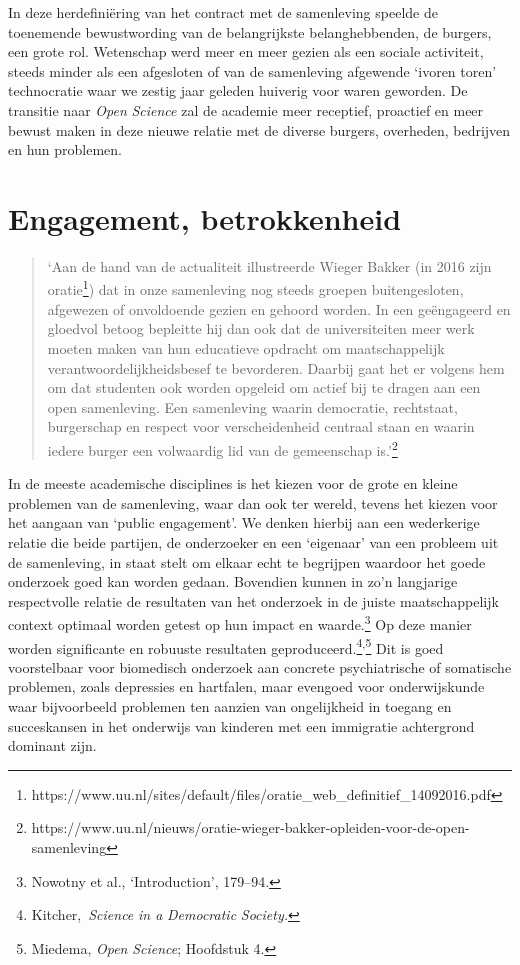 \documentclass[smallauthor, chapterhaspagenum, nochapterinheader, pagenuminheader,  bigchapnum,medium2, tocpages, garamond, titleinheader]{jote-book}
\begin{document}
	In deze herdefiniëring van het contract met de samenleving speelde de toenemende bewustwording van de belangrijkste belanghebbenden, de burgers, een grote rol. Wetenschap werd meer en meer gezien als een sociale activiteit, steeds minder als een afgesloten of van de samenleving afgewende ‘ivoren toren' technocratie waar we zestig jaar geleden huiverig voor waren geworden. De transitie naar \emph{Open }\emph{Science} zal de academie meer receptief, proactief en meer bewust maken in deze nieuwe relatie met de diverse burgers, overheden, bedrijven en hun problemen.



	\section{Engagement, betrokkenheid}

	\begin{quote}
		\itshape

		‘Aan de hand van de actualiteit illustreerde Wieger Bakker (in 2016 zijn oratie\footnote{https://www.uu.nl/sites/default/files/oratie\_web\_definitief\_14092016.pdf}) dat in onze samenleving nog steeds groepen buitengesloten, afgewezen of onvoldoende gezien en gehoord worden. In een geëngageerd en gloedvol betoog bepleitte hij dan ook dat de universiteiten meer werk moeten maken van hun educatieve opdracht om maatschappelijk verantwoordelijkheidsbesef te bevorderen. Daarbij gaat het er volgens hem om dat studenten ook worden opgeleid om actief bij te dragen aan een open samenleving. Een samenleving waarin democratie, rechtstaat, burgerschap en respect voor verscheidenheid centraal staan en waarin iedere burger een volwaardig lid van de gemeenschap is.'\footnote{https://www.uu.nl/nieuws/oratie-wieger-bakker-opleiden-voor-de-open-samenleving}
	\end{quote}

	In de meeste academische disciplines is het kiezen voor de grote en kleine problemen van de samenleving, waar dan ook ter wereld, tevens het kiezen voor het aangaan van ‘public engagement'. We denken hierbij aan een wederkerige relatie die beide partijen, de onderzoeker en een ‘eigenaar' van een probleem uit de samenleving, in staat stelt om elkaar echt te begrijpen waardoor het goede onderzoek goed kan worden gedaan. Bovendien kunnen in zo'n langjarige respectvolle relatie de resultaten van het onderzoek in de juiste maatschappelijk context optimaal worden getest op hun impact en waarde.\footnote{Nowotny et al., ‘Introduction', 179--94.} Op deze manier worden significante en robuuste resultaten geproduceerd.\footnote{Kitcher, \emph{Science}\emph{ in a }\emph{Democratic}\emph{ Society}\emph{.}}\textsuperscript{,}\footnote{Miedema, \emph{Open }\emph{Science}; Hoofdstuk 4.} Dit is goed voorstelbaar voor biomedisch onderzoek aan concrete psychiatrische of somatische problemen, zoals depressies en hartfalen, maar evengoed voor onderwijskunde waar bijvoorbeeld problemen ten aanzien van ongelijkheid in toegang en succeskansen in het onderwijs van kinderen met een immigratie achtergrond dominant zijn.
\end{document}
